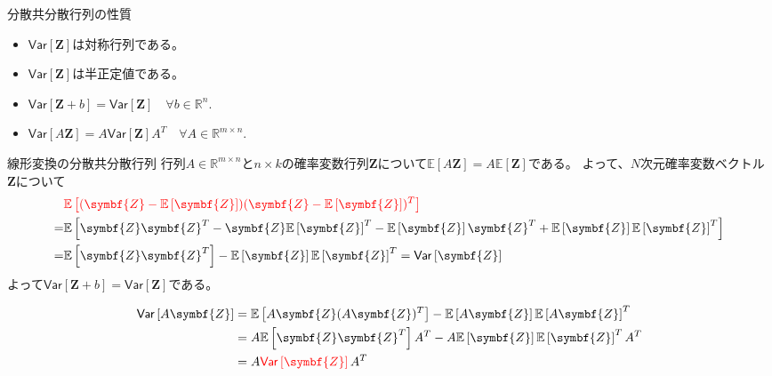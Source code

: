 \documentclass[lualatex,handout]{beamer}
\newcommand{\mycolor}[2]{%
  \begingroup
  \colorlet{currentcolor}{.}%
  \color{#1}#2%
  \color{currentcolor}%
  \endgroup
}
\newcommand{\emm}[1]{\mycolor{red}{#1}}
\newcommand{\expt}[1]{\mathbb{E}\left[#1\right]}
\newcommand{\vc}[1]{\mathsf{Var}\left[#1\right]}
\theoremstyle{definition}
\begin{document}
\begin{frame}{分散共分散行列の性質}
\begin{itemize}
\setlength{\itemsep}{2em}
\item $\vc{\symbf{Z}}$は対称行列である。
\item $\vc{\symbf{Z}}$は半正定値である。
\item $\vc{\symbf{Z}+b}=\vc{\symbf{Z}}\quad\forall b\in\mathbb{R}^n$.
\item $\vc{A\symbf{Z}}=A\vc{\symbf{Z}}A^T\quad\forall A\in\mathbb{R}^{m\times n}$.
\end{itemize}
\end{frame}

\begin{frame}{線形変換の分散共分散行列}
行列$A\in\mathbb{R}^{m\times n}$と$n\times k$の確率変数行列$\symbf{Z}$について$\expt{A\symbf{Z}}=A\expt{\symbf{Z}}$である。
よって、$N$次元確率変数ベクトル$\symbf{Z}$について
\begin{align*}
&\emm{\expt{(\symbf{Z} - \expt{\symbf{Z}})(\symbf{Z} - \expt{\symbf{Z}})^T}}\\
=&\expt{\symbf{Z}\symbf{Z}^T - \symbf{Z}\expt{\symbf{Z}}^T - \expt{\symbf{Z}}\symbf{Z}^T + \expt{\symbf{Z}}\expt{\symbf{Z}}^T}\\
=& \expt{\symbf{Z} \symbf{Z}^T} - \expt{\symbf{Z}}\expt{\symbf{Z}}^T
=\vc{\symbf{Z}}
\end{align*}
よって$\vc{\symbf{Z}+b}=\vc{\symbf{Z}}$である。

\vspace{1em}
\begin{align*}
\vc{A\symbf{Z}}&=\expt{A\symbf{Z} (A\symbf{Z})^T} - \expt{A\symbf{Z}}\expt{A\symbf{Z}}^T\\
&=A\expt{\symbf{Z} \symbf{Z}^T}A^T - A\expt{\symbf{Z}}\expt{\symbf{Z}}^TA^T\\
&=A\emm{\vc{\symbf{Z}}}A^T
\end{align*}
\end{frame}
\end{document}
